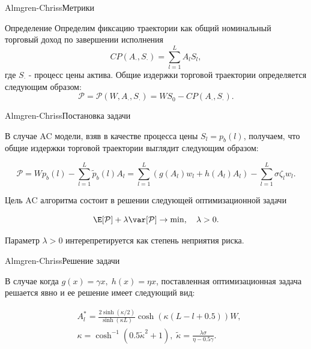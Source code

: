 \documentclass[aspectratio=169]{beamer}
\begin{document}
        \begin{frame}{Almgren-Chriss}{Метрики}
            \begin{block}{Определение}
                Определим фиксацию траектории как общий номинальный торговый доход по завершении исполнения  
                \begin{equation*}
                    CP( A_{\cdot}, S_{\cdot}) = \sum_{l=1}^L A_{l}S_l,
                \end{equation*}
                где $S_{\cdot}$ - процесс цены актива. 
                Общие издержки торговой траектории определяется следующим образом:
                \begin{equation*}
                    \mathcal P = \mathcal P(W, A_{\cdot}, S_{\cdot}) = WS_0 - CP(A_{\cdot}, S_{\cdot}).
                \end{equation*}
            \end{block}
        \end{frame}

        \begin{frame}{Almgren-Chriss}{Постановка задачи}

                В случае AC модели, взяв в качестве процесса цены $S_l = p_b(l)$, получаем, что общие издержки торговой траектории выглядит следующим образом:
        
            \begin{equation*}
                \mathcal P = Wp_b(l) - \sum\limits_{l=1}^L \tilde p_b(l)A_l = \sum\limits_{l=1}^L ( g(A_l)w_l + h(A_l)A_l) - \sum\limits_{l=1}^L \sigma \zeta_l w_l .
            \end{equation*}

            Цель AC алгоритма состоит в решении следующей оптимизационной задачи 

            \begin{equation*}
                \E [ \mathcal P] + \lambda \var[\mathcal P] \to \min, \quad \lambda > 0.
            \end{equation*}

            Параметр $\lambda > 0$ интерепретируется как степень неприятия риска.

        \end{frame}

        \begin{frame}{Almgren-Chriss}{Решение задачи}

            В случае когда $g(x) = \gamma x, \; h(x) = \eta x $, поставленная оптимизационная задача решается явно и ее решение имеет следующий вид:

            \begin{align} 
                &A_l^{*} = \frac{2 \sinh(\kappa/2)}{\sinh(\kappa L)}\cosh(\kappa (L - l + 0.5) )W, \label{Al}\\
                &\kappa = \cosh^{-1}(0.5\tilde \kappa^2 + 1), \; \tilde \kappa = \frac{\lambda \sigma}{\eta - 0.5 \gamma}. \label{kappa}
            \end{align}

        \end{frame}
\end{document}
